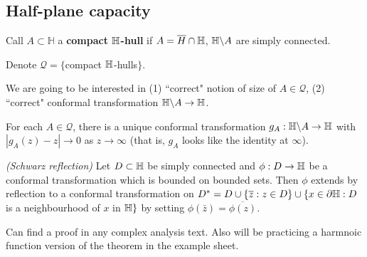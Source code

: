 \documentclass[12pt,a4paper]{article}
\newenvironment{proof}
{\begin{changemargin}{0.5cm}{0.5cm} 
	}%
	{\end{changemargin}
}
\newenvironment{p}
{\begin{proof} 
	}%
	{\end{proof}
}
\begin{document}
\subsection*{Half-plane capacity}

 Call $A\subset \mathbb{H}$ a \textbf{compact $\mathbb{H}$-hull} if $A = \overline{H} \cap \mathbb{H}$, $\mathbb{H} \backslash A$ are simply connected.

\quad Denote $\mathscr{Q} = \{$compact $\mathbb{H}$-hulls$\}$.
\s

We are going to be interested in (1) ``correct" notion of size of $A\in \mathscr{Q}$, (2) ``correct" conformal transformation $\mathbb{H} \backslash A \rightarrow \mathbb{H}$.
\s

 For each $A\in \mathscr{Q}$, there is a unique conformal transformation $g_A : \mathbb{H} \backslash A \rightarrow \mathbb{H}$ with $|g_A(z)-z| \rightarrow 0$ as $z\rightarrow \infty$ (that is, $g_A$ looks like the identity at $\infty$). 
\s

 \emph{(Schwarz reflection)} Let $D\subset \mathbb{H}$ be simply connected and $\phi : D \rightarrow \mathbb{H}$ be a conformal transformation which is bounded on bounded sets. Then $\phi$ extends by reflection to a conformal transformation on $D^* = D \cup \{\overline{z} : z\in D \} \cup \{ x\in \partial \mathbb{H} : D$ is a neighbourhood of $x$ in $\mathbb{H}\}$ by setting $\phi(\bar{z}) = \overline{\phi(z)}$.
\begin{p}
\pf Can find a proof in any complex analysis text. Also will be practicing a harmnoic function version of the theorem in the example sheet.
\end{p}
\s
\end{document}
